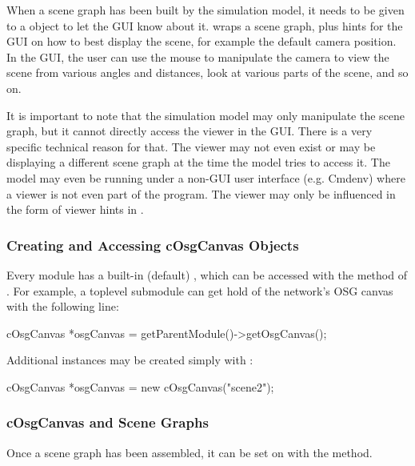When a scene graph has been built by the simulation model, it needs to be
given to a  object to let the {\opp} GUI know about it.
 wraps a scene graph, plus hints for the GUI on how to
best display the scene, for example the default camera position. In the
GUI, the user can use the mouse to manipulate the camera to view the scene
from various angles and distances, look at various parts of the scene,
and so on.

It is important to note that the simulation model may only
manipulate the scene graph, but it cannot directly access the viewer
in the GUI. There is a very specific technical reason for that.
The viewer may not even exist or may be displaying a different
scene graph at the time the model tries to access it. The model
may even be running under a non-GUI user interface (e.g. Cmdenv)
where a viewer is not even part of the program. The viewer may
only be influenced in the form of viewer hints in
.


\subsubsection{Creating and Accessing cOsgCanvas Objects}
\label{sec:graphics:creating-and-accessing-osgcanvas-objects}

Every module has a built-in (default) , which can be
accessed with the  method of .
For example, a toplevel submodule can get hold of the network's
OSG canvas with the following line:

\begin{cpp}
cOsgCanvas *osgCanvas = getParentModule()->getOsgCanvas();
\end{cpp}

Additional  instances may be created simply with :

\begin{cpp}
cOsgCanvas *osgCanvas = new cOsgCanvas("scene2");
\end{cpp}

\subsubsection{cOsgCanvas and Scene Graphs}
\label{sec:graphics:osgcanvas-and-scene-graphs}

Once a scene graph has been assembled, it can be set on 
with the  method.

